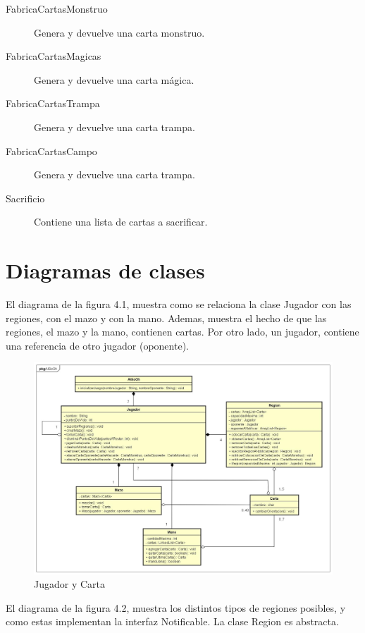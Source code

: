 \begin{description}
\item[FabricaCartasMonstruo] Genera y devuelve una carta monstruo.

\item[FabricaCartasMagicas] Genera y devuelve una carta mágica.

\item[FabricaCartasTrampa] Genera y devuelve una carta trampa.

\item[FabricaCartasCampo] Genera y devuelve una carta trampa.

\item[Sacrificio] Contiene una lista de cartas a sacrificar.

\end{description}


\clearpage
\section{Diagramas de clases}

El diagrama de la figura 4.1, muestra como se relaciona la clase Jugador con las regiones, con el mazo y con la mano. Ademas, muestra el hecho de que las regiones, el mazo y la mano, contienen cartas. Por otro lado, un jugador, contiene una referencia de otro jugador (oponente).

\begin{figure}[H]
	\centering
	\includegraphics[scale=0.3]{includes/Jugador}
	\caption{Jugador y Carta}
	\label{Jugador}
\end{figure}

El diagrama de la figura 4.2, muestra los distintos tipos de regiones posibles, y como estas implementan la interfaz Notificable. La clase Region es abstracta.

